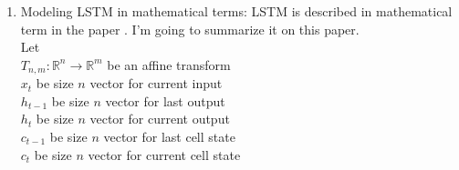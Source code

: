 \documentclass[draft,dvipsnames]{drexel-thesis}
\begin{document}
\begin{thesis}
\begin{enumerate}
\begin{enumerate}
	\item Modeling LSTM in mathematical term{\color{red}s}:
		LSTM is described in mathematical term in the paper \cite{zaremba2014recurrent}. I'm going to summarize it on this paper.\\
	Let\\
	$T_{n,m}: \mathbb{R}^n \rightarrow \mathbb{R}^m$ be an affine transform\\
	$x_t$ be size $n$ vector for current input\\
	$h_{t-1}$ be size $n$ vector for last output \\
	$h_{t}$ be size $n$ vector for current output \\
	$c_{t-1}$ be size $n$ vector for last cell state \\
	$c_{t}$ be size $n$ vector for current cell state \\


\end{enumerate}
\end{enumerate}
\end{thesis}
\end{document}

